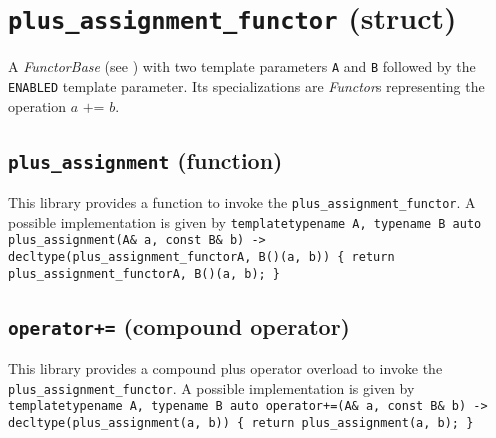 %
%
%
%
%
%
%

\section{\texttt{plus\_assignment\_functor} (struct)}
A \textit{FunctorBase} (see \cite{functors}) with two template parameters \texttt{A} and \texttt{B} followed by the \texttt{ENABLED} template parameter.
Its specializations are \textit{Functor}s representing the operation $\textit{a += b}$.

\subsection{\texttt{plus\_assignment} (function)}
This library provides a function to invoke the \texttt{plus\_assignment\_functor}.
A possible implementation is given by\newline
\texttt{template\textlangle typename A, typename B\textrangle\newline
auto\newline
plus\_assignment(A\& a, const B\& b)\newline
-> decltype(plus\_assignment\_functor\textlangle A, B\textrangle()(a, b))\newline
\{ return plus\_assignment\_functor\textlangle A, B\textrangle()(a, b); \}}

\subsection{\texttt{operator+=} (compound operator)}
This library provides a compound plus operator overload to invoke the \texttt{plus\_assignment\_functor}.
A possible implementation is given by\newline
\texttt{template\textlangle typename A, typename B\textrangle\newline
auto\newline
operator+=(A\& a, const B\& b)\newline
-> decltype(plus\_assignment(a, b))\newline
\{ return plus\_assignment(a, b); \}}
